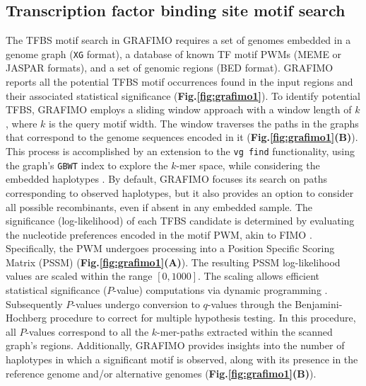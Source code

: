 \documentclass[a4paper, titlepage, openright]{book}
\newcommand{\grafimo}{GRAFIMO\xspace}
\begin{document}
\subsection{Transcription factor binding site motif search}
The TFBS motif search in \grafimo requires a set of genomes embedded in a genome graph (\texttt{XG} format), a database of known TF motif PWMs (MEME or JASPAR formats), and a set of genomic regions (BED format). \grafimo reports all the potential TFBS motif occurrences found in the input regions and their associated statistical significance (\textbf{Fig.\ref{fig:grafimo1}}). To identify potential TFBS, \grafimo employs a sliding window approach with a window length of $k$, where $k$ is the query motif width. The window traverses the paths in the graphs that correspond to the genome sequences encoded in it (\textbf{Fig.\ref{fig:grafimo1}(B)}). This process is accomplished by an extension to the \texttt{vg find} functionality, using the graph's \texttt{GBWT} index to explore the $k$-mer space, while considering the embedded haplotypes \citep{siren2020haplotype}. By default, \grafimo focuses its search on paths corresponding to observed haplotypes, but it also provides an option to consider all possible recombinants, even if absent in any embedded sample. The significance (log-likelihood) of each TFBS candidate is determined by evaluating the nucleotide preferences encoded in the motif PWM, akin to FIMO \citep{grant2011fimo}. Specifically, the PWM undergoes processing into a Position Specific Scoring Matrix (PSSM) (\textbf{Fig.\ref{fig:grafimo1}(A)}). The resulting PSSM log-likelihood values are scaled within the range $[0, 1000]$. The scaling allows efficient statistical significance ($P$-value) computations via dynamic programming \citep{grant2011fimo}. Subsequently $P$-values undergo conversion to $q$-values through the Benjamini-Hochberg procedure to correct for multiple hypothesis testing. In this procedure, all $P$-values correspond to all the $k$-mer-paths extracted within the scanned graph's regions. Additionally, \grafimo provides insights into the number of haplotypes in which a significant motif is observed, along with its presence in the reference genome and/or alternative genomes (\textbf{Fig.\ref{fig:grafimo1}(B)}). 
\end{document}
